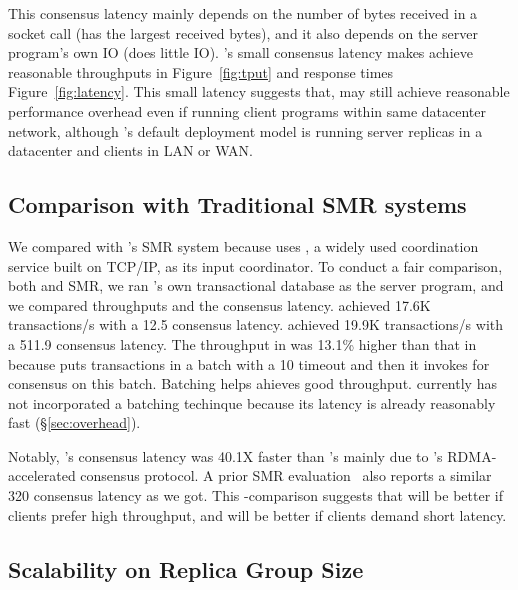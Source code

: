 This consensus latency mainly depends on the number of bytes received in a 
socket call (\mongodb has the largest received bytes), and it also depends on 
the server program's own IO (\redis does little IO). \xxx's small consensus 
latency makes \xxx achieve reasonable throughputs in Figure~\ref{fig:tput} 
and response times Figure~\ref{fig:latency}. This small latency suggests that, 
\xxx may still achieve reasonable performance overhead even if running client 
programs within same datacenter network, although \xxx's default deployment 
model is running server replicas in a datacenter and clients in LAN or WAN.

\subsection{Comparison with Traditional SMR systems} \label{sec:compare}

We compared \xxx with \calvin's SMR system because \calvin uses \zookeeper, a 
widely used coordination service built on TCP/IP, as its input coordinator. To 
conduct a fair comparison, both \xxx and \calvin SMR, we ran \calvin's own 
transactional database as the server program, and we compared throughputs and 
the consensus latency. \xxx achieved 17.6K transactions/s with a 12.5 \us 
consensus latency. \calvin achieved 19.9K transactions/s with a 511.9 \us 
consensus latency. The throughput in \calvin was 13.1\% higher than that in
\xxx because \calvin puts transactions in a batch with a 10 \ms timeout and 
then it invokes \zookeeper for consensus on this batch. Batching helps \calvin 
ahieves good throughput. \xxx currently has not incorporated a batching 
techinque because its latency is already reasonably fast 
(\S\ref{sec:overhead}).

Notably, \xxx's consensus latency was 40.1X faster than \zookeeper's mainly due 
to \xxx's RDMA-accelerated consensus protocol. A prior SMR
evaluation~\cite{dare:hpdc15} also reports a similar 320 \us \zookeeper 
consensus latency as we got. This \xxx-\calvin comparison suggests that \calvin 
will be better if clients prefer high throughput, and \xxx will be better if 
clients demand short latency.



\subsection{Scalability on Replica Group Size} \label{sec:scalability}

